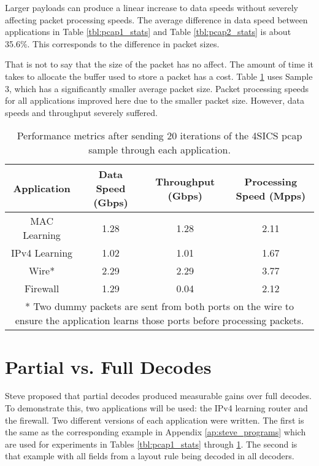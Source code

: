 Larger payloads can produce a linear increase to data speeds without severely affecting packet processing speeds. The average difference in data speed between applications in Table \ref{tbl:pcap1_stats} and Table \ref{tbl:pcap2_stats} is about 35.6\%. This corresponds to the difference in packet sizes.

That is not to say that the size of the packet has no affect. The amount of time it takes to allocate the buffer used to store a packet has a cost. Table \ref{tbl:pcap3_stats} uses Sample 3, which has a significantly smaller average packet size. Packet processing speeds for all applications improved here due to the smaller packet size. However, data speeds and throughput severely suffered.

\begin{table}[ht]
\caption{Performance metrics after sending 20 iterations of the 4SICS pcap sample through each application.}
\begin{center}
\begin{tabularx}{\textwidth}{| c || c | c | c | }
\hline
Application & Data Speed (Gbps) & Throughput (Gbps) & Processing Speed (Mpps) \\
\hline
MAC Learning & 1.28 & 1.28 & 2.11  \\
\hline
IPv4 Learning & 1.02 & 1.01 & 1.67  \\
\hline 
Wire* & 2.29 & 2.29 & 3.77 \\
\hline
Firewall & 1.29 & 0.04 & 2.12 \\
\hline
\multicolumn{4}{p{\linewidth}}{* Two dummy packets are sent from both ports on the wire to ensure the application learns those ports before processing packets.}
\end{tabularx}
\end{center}
\label{tbl:pcap3_stats}
\end{table}


\section{Partial vs. Full Decodes} \label{exp:decode_comparison}

Steve proposed that partial decodes produced measurable gains over full decodes. To demonstrate this, two applications will be used: the IPv4 learning router and the firewall. Two different versions of each application were written. The first is the same as the corresponding example in Appendix \ref{ap:steve_programs} which are used for experiments in Tables \ref{tbl:pcap1_stats} through \ref{tbl:pcap3_stats}. The second is that example with all fields from a layout rule being decoded in all decoders.

